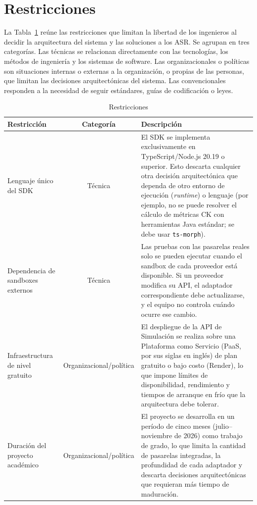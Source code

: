 \section{Restricciones}
La Tabla~\ref{tab:restricciones} reúne las restricciones que limitan la libertad de los ingenieros al decidir la arquitectura del sistema y las soluciones a los ASR. Se agrupan en tres categorías. Las técnicas se relacionan directamente con las tecnologías, los métodos de ingeniería y los sistemas de software. Las organizacionales o políticas son situaciones internas o externas a la organización, o propias de las personas, que limitan las decisiones arquitectónicas del sistema. Las convencionales responden a la necesidad de seguir estándares, guías de codificación o leyes.

\begin{table}[htbp]
\centering
\caption{Restricciones}
\label{tab:restricciones}
\renewcommand{\arraystretch}{1.3}
\begin{tabularx}{\textwidth}{|>{\raggedright\arraybackslash}p{4cm}|c|X|}
\hline
\textbf{Restricción} & \textbf{Categoría} & \textbf{Descripción} \\ \hline
Lenguaje único del SDK & Técnica & El SDK se implementa exclusivamente en TypeScript/Node.js 20.19 o superior. Esto descarta cualquier otra decisión arquitectónica que dependa de otro entorno de ejecución (\textit{runtime}) o lenguaje (por ejemplo, no se puede resolver el cálculo de métricas CK con herramientas Java estándar; se debe usar \texttt{ts-morph}). \\ \hline
Dependencia de sandboxes externos & Técnica & Las pruebas con las pasarelas reales solo se pueden ejecutar cuando el sandbox de cada proveedor está disponible. Si un proveedor modifica su API, el adaptador correspondiente debe actualizarse, y el equipo no controla cuándo ocurre ese cambio. \\ \hline
Infraestructura de nivel gratuito & Organizacional/política & El despliegue de la API de Simulación se realiza sobre una Plataforma como Servicio (PaaS, por sus siglas en inglés) de plan gratuito o bajo costo (Render), lo que impone límites de disponibilidad, rendimiento y tiempos de arranque en frío que la arquitectura debe tolerar. \\ \hline
Duración del proyecto académico & Organizacional/política & El proyecto se desarrolla en un período de cinco meses (julio--noviembre de 2026) como trabajo de grado, lo que limita la cantidad de pasarelas integradas, la profundidad de cada adaptador y descarta decisiones arquitectónicas que requieran más tiempo de maduración. \\ \hline

\end{tabularx}
\end{table}
